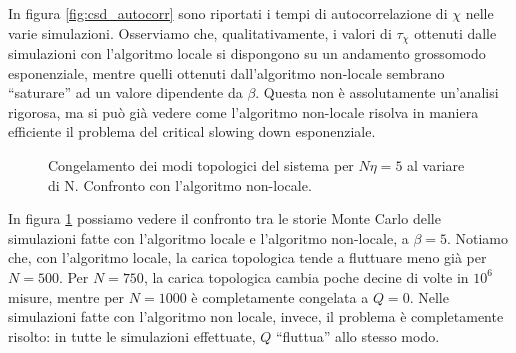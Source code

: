 \documentclass[a4paper,11pt]{article}
\begin{document}
    
    In figura \ref{fig:csd_autocorr} sono riportati i tempi di autocorrelazione di $\chi$ nelle varie simulazioni. Osserviamo che, qualitativamente, i valori di $\tau_\chi$ ottenuti dalle simulazioni con l'algoritmo locale si dispongono su un andamento grossomodo esponenziale, mentre quelli ottenuti dall'algoritmo non-locale sembrano ``saturare'' ad un valore dipendente da $\beta$. Questa non è assolutamente un'analisi rigorosa, ma si può già vedere come l'algoritmo non-locale risolva in maniera efficiente il problema del critical slowing down esponenziale.
    
    \begin{figure}[hptb]
        \centering
        \caption{Congelamento dei modi topologici del sistema per $N\eta = 5$ al variare di N. Confronto con l'algoritmo non-locale.}
        \label{fig:csd_topfreezing}
    \end{figure}
    
    In figura \ref{fig:csd_topfreezing} possiamo vedere il confronto tra le storie Monte Carlo delle simulazioni fatte con l'algoritmo locale e l'algoritmo non-locale, a $\beta = 5$. Notiamo che, con l'algoritmo locale, la carica topologica tende a fluttuare meno già per $N = 500$. Per $N = 750$, la carica topologica cambia poche decine di volte in $10^6$ misure, mentre per $N = 1000$ è completamente congelata a $Q = 0$. Nelle simulazioni fatte con l'algoritmo non locale, invece, il problema è completamente risolto: in tutte le simulazioni effettuate, $Q$ ``fluttua'' allo stesso modo.
    
\end{document}
